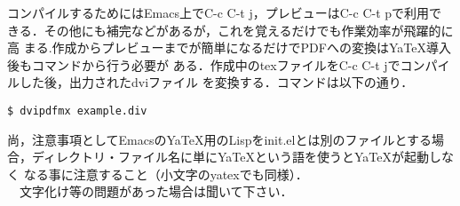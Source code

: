 \documentclass[12pt,a4j]{jarticle}
\begin{document}
コンパイルするためにはEmacs上でC-c C-t j，プレビューはC-c C-t pで利用で
きる．その他にも補完などがあるが，これを覚えるだけでも作業効率が飛躍的に高
まる.作成からプレビューまでが簡単になるだけでPDFへの変換はYaTeX導入後もコマンドから行う必要が
ある．作成中のtexファイルをC-c C-t jでコンパイルした後，出力されたdviファイル
を変換する．コマンドは以下の通り．

{
\small
\begin{verbatim}
$ dvipdfmx example.div
\end{verbatim}
}

尚，注意事項としてEmacsのYaTeX用のLispをinit.elとは別のファイルとする場
合，ディレクトリ・ファイル名に単にYaTeXという語を使うとYaTeXが起動しなく
なる事に注意すること（小文字のyatexでも同様）．\\
　文字化け等の問題があった場合は聞いて下さい．
\end{document}

